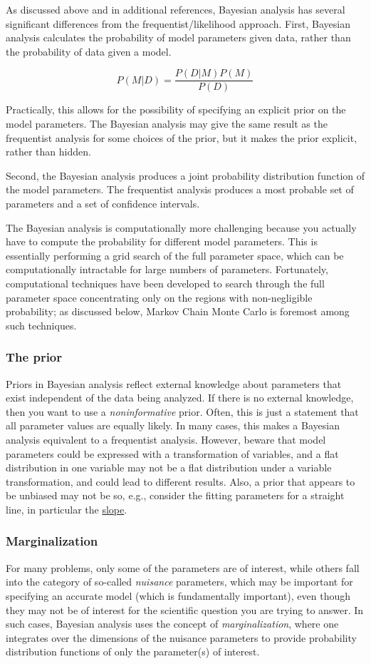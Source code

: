 \documentclass{article}
\begin{document}
As discussed above and in additional references, Bayesian analysis has
several significant differences from the frequentist/likelihood
approach. First, Bayesian analysis calculates the probability of model
parameters given data, rather than the probability of data given a
model.

$$ P(M|D) = \frac{P(D|M)P(M)}{P(D)} $$

Practically, this allows for the possibility of specifying an explicit
prior on the model parameters. The Bayesian analysis may give the same
result as the frequentist analysis for some choices of the prior, but
it makes the prior explicit, rather than hidden.

Second, the Bayesian analysis produces a joint probability
distribution function of the model parameters. The frequentist
analysis produces a most probable set of parameters and a set of
confidence intervals.

The Bayesian analysis is computationally more challenging because you
actually have to compute the probability for different model
parameters. This is essentially performing a grid search of the full
parameter space, which can be computationally intractable for large
numbers of parameters. Fortunately, computational techniques have been
developed to search through the full parameter space concentrating
only on the regions with non-negligible probability; as discussed
below, Markov Chain Monte Carlo is foremost among such techniques.

\subsubsection{The prior}
Priors in Bayesian analysis reflect external knowledge about
parameters that exist independent of the data being analyzed. If there
is no external knowledge, then you want to use a \emph{noninformative} prior.
Often, this is just a statement that all parameter values are equally likely.
In many cases, this makes a Bayesian analysis equivalent to a frequentist
analysis. However, beware that model parameters could be expressed with a
transformation of variables, and a flat distribution in one variable may not be
a flat distribution under a variable transformation, and could lead to
different results. Also, a prior that appears to be unbiased may not be so,
e.g., consider the fitting parameters for a straight line, in particular the
\href{http://astronomy.nmsu.edu/holtz/a575/images/slope.png}
{slope}.

\subsubsection{Marginalization}
For many problems, only some of the parameters are of interest, while
others fall into the category of so-called \emph{nuisance} parameters, which
may be important for specifying an accurate model (which is
fundamentally important), even though they may not be of interest for
the scientific question you are trying to answer. In such cases,
Bayesian analysis uses the concept of \emph{marginalization}, where one
integrates over the dimensions of the nuisance parameters to provide
probability distribution functions of only the parameter(s) of
interest.
\end{document}
